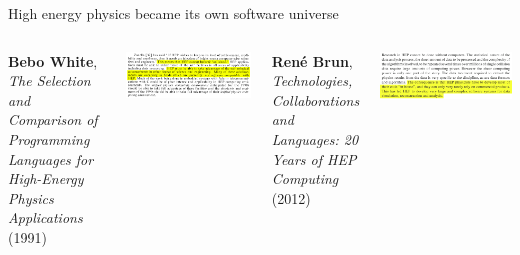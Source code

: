 \documentclass[aspectratio=169]{beamer}
\begin{document}
\begin{frame}{High energy physics became its own software universe}
\vspace{0.25 cm}
\begin{columns}[t]
\begin{center}
\begin{minipage}{0.9\linewidth}
\begin{center}
{\bf Bebo White}, {\it The Selection and Comparison of Programming Languages for High-Energy Physics Applications} (1991)
\end{center}
\end{minipage}
\end{center}

\includegraphics[width=\linewidth]{PLOTS/bebo-white-conclusions3.png}

\begin{center}
\begin{minipage}{0.85\linewidth}
\begin{center}
{\bf Ren\'e Brun}, {\it Technologies, Collaborations and Languages: 20 Years of HEP Computing} (2012)
\end{center}
\end{minipage}
\end{center}

\includegraphics[width=\linewidth]{PLOTS/rene-brun-introduction.png}
\end{columns}
\end{frame}
\end{document}
